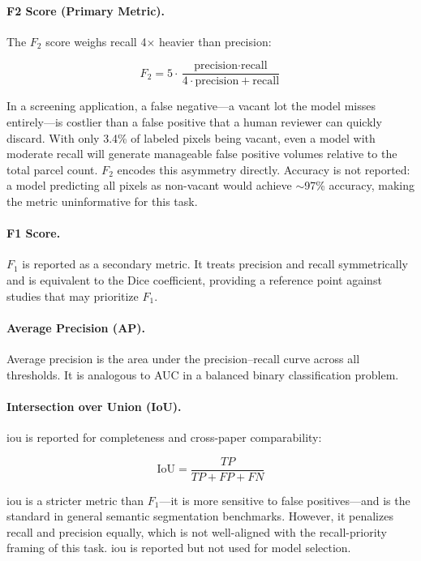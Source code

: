 \paragraph{F2 Score (Primary Metric).}
The $F_2$ score weighs recall 4$\times$ heavier than precision:

\begin{equation}
  F_2 = 5 \cdot \frac{\text{precision} \cdot \text{recall}}{4 \cdot \text{precision} + \text{recall}}
  \label{eq:f2}
\end{equation}

In a screening application, a false negative---a vacant lot the model misses entirely---is costlier than a false positive that a human reviewer can quickly discard. With only 3.4\% of labeled pixels being vacant, even a model with moderate recall will generate manageable false positive volumes relative to the total parcel count. $F_2$ encodes this asymmetry directly. Accuracy is not reported: a model predicting all pixels as non-vacant would achieve $\sim$97\% accuracy, making the metric uninformative for this task.

\paragraph{F1 Score.}
$F_1$ is reported as a secondary metric. It treats precision and recall symmetrically and is equivalent to the Dice coefficient, providing a reference point against studies that may prioritize $F_1$.

\paragraph{Average Precision (AP).}
Average precision is the area under the precision--recall curve across all thresholds. It is analogous to AUC in a balanced binary classification problem.

\paragraph{Intersection over Union (IoU).}
\acrshort{iou} is reported for completeness and cross-paper comparability:

\begin{equation}
  \text{IoU} = \frac{TP}{TP + FP + FN}
  \label{eq:iou}
\end{equation}

\acrshort{iou} is a stricter metric than $F_1$---it is more sensitive to false positives---and is the standard in general semantic segmentation benchmarks. However, it penalizes recall and precision equally, which is not well-aligned with the recall-priority framing of this task. \acrshort{iou} is reported but not used for model selection.


